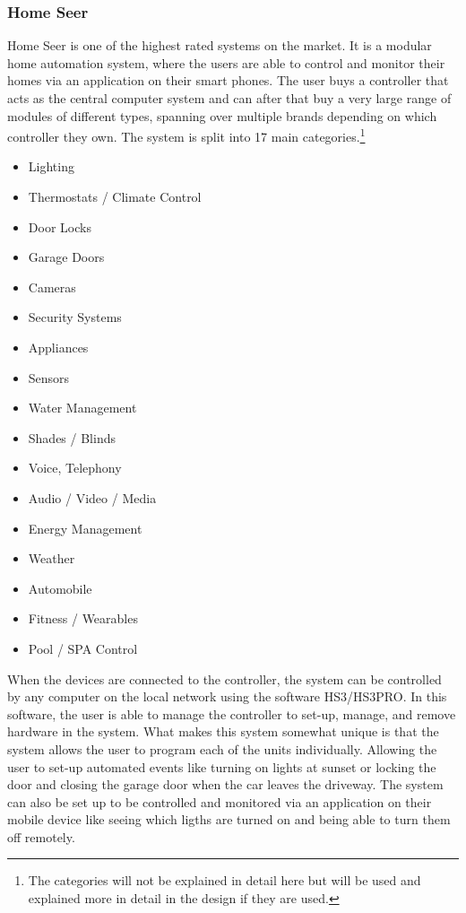 \subsubsection{Home Seer}
Home Seer is one of the highest rated systems on the market. It is a modular home automation system, where the users are able to control and monitor their homes via an application on their smart phones. The user buys a controller that acts as the central computer system and can after that buy a very large range of modules of different types, spanning over multiple brands depending on which controller they own. The system is split into 17 main categories.\footnote{The categories will not be explained in detail here but will be used and explained more in detail in the design if they are used.}
\begin{itemize}
	\item Lighting
	\item Thermostats / Climate Control
	\item Door Locks
	\item Garage Doors
	\item Cameras
	\item Security Systems
	\item Appliances
	\item Sensors
	\item Water Management
	\item Shades / Blinds
	\item Voice, Telephony
	\item Audio / Video / Media
	\item Energy Management
	\item Weather
	\item Automobile
	\item Fitness / Wearables
	\item Pool / SPA Control
\end{itemize}%
When the devices are connected to the controller, the system can be controlled by any computer on the local network using the software HS3/HS3PRO. In this software, the user is able to manage the controller to set-up, manage, and remove hardware in the system. What makes this system somewhat unique is that the system allows the user to program each of the units individually. Allowing the user to set-up automated events like turning on lights at sunset or locking the door and closing the garage door when the car leaves the driveway. The system can also be set up to be controlled and monitored via an application on their mobile device like seeing which ligths are turned on and being able to turn them off remotely.%

